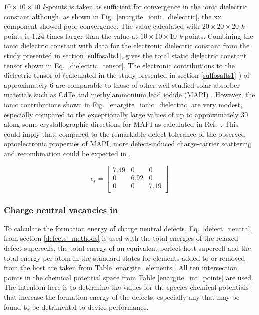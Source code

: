 \documentclass[11pt, twoside]{report}
\begin{document}

$10\times10\times10$ \textit{k}-points is taken as sufficient for convergence in the ionic dielectric constant although, as shown in Fig.~\ref{enargite_ionic_dielectric}, the xx component showed poor convergence. The value calculated with $20\times20\times20$ \textit{k}-points is 1.24 times larger than the value at $10\times10\times10$ \textit{k}-points. Combining the ionic dielectric constant with data for the electronic dielectric constant from the study presented in section \ref{sulfosalts1}, gives the total static dielectric constant tensor shown in Eq.~\ref{dielectric_tensor}. The electronic contributions to the dielectric tensor of {\enargite} (calculated in the study presented in section \ref{sulfosalts1} \cite{sulfosalts_paper}) of approximately 6 are comparable to those of other well-studied solar absorber materials such as CdTe and methylammonium lead iodide (MAPI) \cite{Federico}. However, the ionic contributions shown in Fig.~\ref{enargite_ionic_dielectric} are very modest, especially compared to the exceptionally large values of up to approximately 30 along some crystallographic directions for MAPI as calculated in Ref.~. This could imply that, compared to the remarkable defect-tolerance of the observed optoelectronic properties of MAPI, more defect-induced charge-carrier scattering and recombination could be expected in {\enargite}.

\begin{equation}\label{dielectric_tensor}
\epsilon_s = 
\begin{bmatrix}
7.49 & 0 & 0 \\
0 & 6.92 & 0 \\
0 & 0 & 7.19 \\
\end{bmatrix}
\end{equation}

\subsubsection{Charge neutral vacancies in {\enargite}}
To calculate the formation energy of charge neutral defects, Eq.~\ref{defect_neutral} from section \ref{defects_methods} is used with the total energies of the relaxed defect supercells, the total energy of an equivalent perfect host supercell and the total energy per atom in the standard states for elements added to or removed from the host are taken from Table \ref{enargite_elements}. All ten intersection points in the chemical potential space from Table \ref{enargite_int_points} are used. The intention here is to determine the values for the species chemical potentials that increase the formation energy of the defects, especially any that may be found to be detrimental to device performance.
\end{document}
